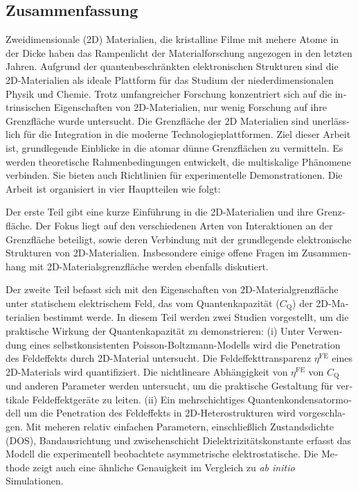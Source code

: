 \endgroup

\cleardoublepage%

\begingroup
\let\clearpage\relax
\let\cleardoublepage\relax
\let\cleardoublepage\relax

\begin{otherlanguage}{ngerman}
\chapter*{Zusammenfassung}

Zweidimensionale (2D) Materialien, die kristalline Filme mit mehere Atome in der Dicke haben das Rampenlicht der Materialforschung angezogen
in den letzten Jahren.
%
Aufgrund der quantenbeschränkten elektronischen Strukturen sind die 2D-Materialien
als ideale Plattform für das Studium der niederdimensionalen Physik und
Chemie.
%
Trotz umfangreicher Forschung konzentriert sich auf die intrinsischen Eigenschaften
von 2D-Materialien, nur wenig Forschung auf ihre Grenzfläche wurde untersucht.
Die  Grenzfläche der 2D Materialien sind unerlässlich für die Integration in die moderne
Technologieplattformen.
%
Ziel dieser Arbeit ist, grundlegende Einblicke in die
atomar dünne Grenzflächen zu vermitteln.
Es werden theoretische Rahmenbedingungen entwickelt, die multiskalige Phänomene verbinden.
Sie bieten auch Richtlinien für experimentelle
Demonstrationen.
Die Arbeit ist organisiert
in vier Hauptteilen wie folgt:

Der erste Teil gibt eine kurze Einführung in die 2D-Materialien und
ihre Grenzfläche.
%
Der Fokus liegt auf den verschiedenen Arten von Interaktionen
an der Grenzfläche beteiligt, sowie deren Verbindung mit der
grundlegende elektronische Strukturen von 2D-Materialien.
%
Insbesondere einige offene Fragen im Zusammenhang mit
2D-Materialsgrenzfläche werden ebenfalls diskutiert.

Der zweite Teil befasst sich mit den Eigenschaften von
2D-Materialgrenzfläche unter statischem elektrischem Feld, das vom
Quantenkapazität ($C_{\mathrm{Q}}$) der 2D-Materialien bestimmt
werde.
%
In diesem Teil werden zwei Studien vorgestellt, um die praktische Wirkung der Quantenkapazität zu demonstrieren:
%
(i) Unter Verwendung eines selbstkonsistenten
Poisson-Boltzmann-Modells wird die Penetration des Feldeffekts durch
2D-Material untersucht. Die Feldeffekttransparenz $\eta^{\mathrm{FE}}$
eines 2D-Materials wird quantifiziert. Die nichtlineare Abhängigkeit
von $\eta^{\mathrm{FE}}$ von $C_{\mathrm{Q}}$ und anderen Parameter
werden untersucht, um die praktische Gestaltung für vertikale
Feldeffektgeräte zu leiten.
%
(ii) Ein mehrschichtiges Quantenkondensatormodell um die
Penetration des Feldeffekts in 2D-Heterostrukturen wird vorgeschlagen.
%
Mit meheren relativ einfachen Parametern, einschließlich Zustandsdichte (DOS), Bandausrichtung
und zwischenschicht Dielektrizitätskonstante erfasst das Modell die
experimentell beobachtete asymmetrische elektrostatische.
Die Methode zeigt auch eine ähnliche Genauigkeit im Vergleich zu \textit{ab initio}
Simulationen.


\end{otherlanguage}
